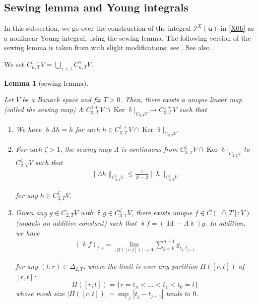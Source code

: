 \documentclass[letterpaper, 11pt,  reqno]{amsart}
\newtheorem{lemma}[theorem]{Lemma}
\DeclareMathOperator{\Id}{Id}
\DeclareMathOperator{\Ker}{Ker}
\newcommand{\1}{\hspace{0.5mm}\text{I}\hspace{0.5mm}}
\newcommand{\I}{\mathcal{I}}
\newcommand{\noi}{\noindent}
\newcommand{\updl}{\updelta}
\newcommand{\Dl}{\Delta}
\newcommand{\g}{\gamma}
\newcommand{\uu}{\mathbf{u}}
\newcommand{\z}{\zeta}
\numberwithin{equation}{section}
\numberwithin{theorem}{section}
\begin{document}
\subsection{Sewing lemma and Young integrals}
\label{SUBSEC:Y2}

In this subsection, 
we go over the construction 
of
 the integral $\I^X(\uu)$ in  \eqref{X0b} 
 as a nonlinear Young integral, 
 using the sewing lemma.
The following version of the sewing lemma
is taken from 
\cite{GT10} 
with slight modifications; 
see  
\cite[Proposition 2.3, Corollary 2.4, Corollary 2.5]{GT10}.
See also \cite[Lemma 4.2]{FH20}.

We set 
$C^{1+}_{n,T}V = \bigcup_{\g>1}C^\g_{n,T}V$.

\begin{lemma}[sewing lemma]
\label{LEM:sew}


Let $V$ be a Banach space and 
fix $T>0$. 
Then,  there exists a unique linear map \textup{(}called the sewing map\textup{)}
$\Lambda:C^{1+}_{3,T} V \cap 
\Ker \updl|_{C_{3,T}V}
\to C^{1+}_{2,T}V$ such that 

\smallskip
\begin{enumerate}
\item[(i)] 
We have 
$\updl \Lambda h = h$
for each  $h\in C^{1+}_{3,T}V\cap \Ker  \updl|_{C_{3,T} V}$.



\smallskip

\item[(ii)]
 For each $\z >1$,
the sewing map $\Lambda$ is continuous
from $C^\z _{3,T}V\cap 
\Ker  \updl|_{C_{3,T} V}$ to 
$C^\z _{2,T}V$ such that 
\begin{align}
\|\Lambda h \|_{C^\z _{2,T}V} 
\le \frac{1}{2^\z - 2}  \| h \|_{C^\z _{3,T}V} 
\label{sew1}
\end{align}


\noi
for any $h\in C^\z _{3,T}V$.



\smallskip
\item[(iii)] 
Given any  $g\in C_{2,T}V$ 
with 
$\updl g\in C^\z _{3,T}V$, 
 there exists  unique
$f\in C([0, T];V)$  \textup{(}modulo an additive  constant\textup{)} 
such that 
$\updl f = (\Id - \Lambda \updl)g$. 
In addition, 
we have 
\begin{align}
(\updl f)_{t,r} = \lim_{|\Pi([r,t])|\to 0} 
\sum_{j=0}^{n-1} g_{t_j,t_{j+1}}
\label{sew2}
\end{align}


\noi
 for any $(t,r)\in \Dl_{2,T}$,
 where 
 the limit is over any partition
 $\Pi([r,t])$  
 of  $[r,t]$\textup{:} 
\[\Pi ([r,t]) = \{r = t_n < \dots < t_1 <  t_0 = t\}\]
whose mesh size 
$|\Pi([r,t])| = \sup_{j} |t_j-t_{j+1}|$ 
tends to $0$.


\end{enumerate}


\end{lemma}
\end{document}
